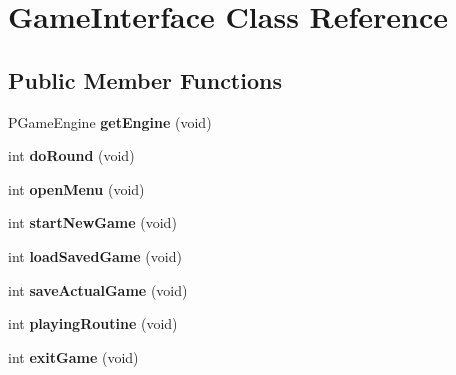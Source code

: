 \hypertarget{classGameInterface}{}\section{Game\+Interface Class Reference}
\label{classGameInterface}
\subsection*{Public Member Functions}
\begin{DoxyCompactItemize}
\item 
P\+Game\+Engine {\bfseries get\+Engine} (void)\hypertarget{classGameInterface_a0d60098b2f94bb20efb20196904dc30b}{}\label{classGameInterface_a0d60098b2f94bb20efb20196904dc30b}

\item 
int {\bfseries do\+Round} (void)\hypertarget{classGameInterface_a34f3d7f2ba56662cc0108b54b19fc162}{}\label{classGameInterface_a34f3d7f2ba56662cc0108b54b19fc162}

\item 
int {\bfseries open\+Menu} (void)\hypertarget{classGameInterface_a19dc01c2f82f5140e56980f5c02a8f55}{}\label{classGameInterface_a19dc01c2f82f5140e56980f5c02a8f55}

\item 
int {\bfseries start\+New\+Game} (void)\hypertarget{classGameInterface_a8a65a71277e660b053441c6bccdd21b9}{}\label{classGameInterface_a8a65a71277e660b053441c6bccdd21b9}

\item 
int {\bfseries load\+Saved\+Game} (void)\hypertarget{classGameInterface_a1fe1e9abc88b994338f22202dae74a29}{}\label{classGameInterface_a1fe1e9abc88b994338f22202dae74a29}

\item 
int {\bfseries save\+Actual\+Game} (void)\hypertarget{classGameInterface_ae069b22415177addad2bd7999b9eb2d9}{}\label{classGameInterface_ae069b22415177addad2bd7999b9eb2d9}

\item 
int {\bfseries playing\+Routine} (void)\hypertarget{classGameInterface_ac64abd0ec216c442a4cae4d09f94ab0a}{}\label{classGameInterface_ac64abd0ec216c442a4cae4d09f94ab0a}

\item 
int {\bfseries exit\+Game} (void)\hypertarget{classGameInterface_ab0ded12c364ac64a8362959608201b98}{}\label{classGameInterface_ab0ded12c364ac64a8362959608201b98}


\end{DoxyCompactItemize}
